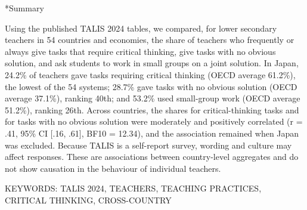\documentclass[a4paper,10pt,twocolumn]{ltjsarticle}
\makeatletter
\renewcommand{\section}{\@startsection{section}{1}{\z@}{1.1\Cvs \@plus.4\Cdp \@minus.2\Cdp}{.5\Cvs \@plus.2\Cdp}{\normalfont\gtfamily\bfseries\large}}
\makeatother
\begin{document}
\section*{Summary}
{\footnotesize\setlength{\parindent}{0pt}Using the published TALIS 2024 tables, we compared, for lower secondary teachers in 54 countries and economies, the share of teachers who frequently or always give tasks that require critical thinking, give tasks with no obvious solution, and ask students to work in small groups on a joint solution. In Japan, 24.2\% of teachers gave tasks requiring critical thinking (OECD average 61.2\%), the lowest of the 54 systems; 28.7\% gave tasks with no obvious solution (OECD average 37.1\%), ranking 40th; and 53.2\% used small-group work (OECD average 51.2\%), ranking 26th. Across countries, the shares for critical-thinking tasks and for tasks with no obvious solution were moderately and positively correlated (r = .41, 95\% CI [.16, .61], BF10 = 12.34), and the association remained when Japan was excluded. Because TALIS is a self-report survey, wording and culture may affect responses. These are associations between country-level aggregates and do not show causation in the behaviour of individual teachers.\par\smallskip KEYWORDS: TALIS 2024, TEACHERS, TEACHING PRACTICES, CRITICAL THINKING, CROSS-COUNTRY\par}
\medskip\noindent{}
\end{document}
